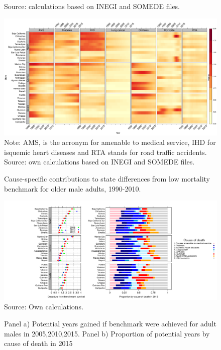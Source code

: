 \documentclass{bmcart}
\begin{document}
\begin{backmatter}
\begin{figure}[h!]
 Source: calculations based on INEGI and SOMEDE files.
\end{figure}



\begin{figure}[h!]
\centering
\caption{Cause-specific contributions to state differences from low mortality benchmark for older male adults, 1990-2010.}
\label{Fig3}

\includegraphics[scale=.23]{AdultMaleheatmap.pdf}
Note: AMS, is the acronym for amenable to medical service, IHD for isquemic heart diseases and RTA stands for road traffic accidents. Source: own calculations based on INEGI and SOMEDE files. 
\end{figure}


\begin{figure}[h!]
\centering
\caption{Panel a) Potential years gained if benchmark were achieved for adult males in 2005,2010,2015. Panel b) Proportion of potential years by cause of death in 2015 }
\label{Fig4}
\includegraphics[scale=.33]{Figure_4.pdf}
Source: Own calculations.
\end{figure}



\end{backmatter}
\end{document}
